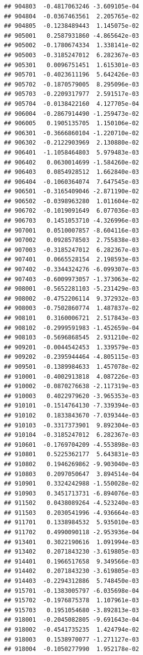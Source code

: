 \documentclass[ignorenonframetext,]{beamer}
\begin{document}
\begin{frame}[fragile]
\begin{verbatim}
## 904803  -0.4817063246 -3.609105e-04
## 904804  -0.0367463561  2.205765e-02
## 904805  -0.1238489443  1.145075e-02
## 905001   0.2587931860 -4.865642e-03
## 905002  -0.1780674334  1.338141e-02
## 905003  -0.3185247012  6.282367e-03
## 905301   0.0096751451  1.615301e-03
## 905701  -0.4023611196  5.642426e-03
## 905702  -0.1870579005  8.295096e-03
## 905703  -0.2209317977  2.591517e-03
## 905704  -0.0138422160  4.127705e-04
## 906004  -0.2867914490 -1.259473e-02
## 906005   0.1905135705  1.150106e-02
## 906301  -0.3666860104 -1.220710e-02
## 906302  -0.2122903969  2.130880e-02
## 906401  -1.1058464803  5.979483e-03
## 906402   0.0630014699 -1.584260e-02
## 906403   0.0854928512  1.662840e-03
## 906404  -0.1060364074  7.647545e-03
## 906501  -0.3165409046 -2.871190e-02
## 906502  -0.0398963280  1.011604e-02
## 906702  -0.1019091649  6.077036e-03
## 906703   0.1451053710 -4.326996e-03
## 907001   0.0510007857 -8.604116e-03
## 907002   0.0928578503  2.755838e-03
## 907003  -0.3185247012  6.282367e-03
## 907401   0.0665528154  2.198593e-03
## 907402  -0.3344324276 -6.099307e-03
## 907403  -0.6009973057 -1.373063e-02
## 908001  -0.5652281103 -5.231429e-03
## 908002  -0.4752206114  9.372932e-03
## 908003  -0.7502860774  1.487837e-02
## 908101   0.3160006721  2.517843e-03
## 908102  -0.2999591983 -1.452659e-04
## 908103  -0.5696868545  2.931210e-02
## 909201  -0.0044542453  1.339579e-03
## 909202  -0.2395944464 -4.805115e-03
## 909501  -0.1389984633  1.457078e-02
## 910001  -0.4002913818  4.087226e-03
## 910002  -0.0870276638 -2.117319e-03
## 910003   0.4022979620 -3.965353e-03
## 910101  -0.1514764130 -7.339394e-03
## 910102   0.1833843670 -7.039344e-03
## 910103  -0.3317373901  9.892304e-03
## 910104  -0.3185247012  6.282367e-03
## 910601  -0.1769704209 -4.553898e-03
## 910801   0.5225362177  5.643831e-03
## 910802   0.1946269862 -9.903040e-03
## 910803   0.2097050647  3.894514e-04
## 910901   0.3324242988 -1.550028e-02
## 910903   0.3451713731 -6.894076e-03
## 911502   0.0438089264 -4.523240e-03
## 911503   0.2030541996 -4.936664e-03
## 911701   0.1338984532  5.935010e-03
## 911702   0.4990090118 -2.953936e-04
## 913401   0.3022190616  1.091994e-03
## 913402   0.2071843230 -3.619805e-03
## 914401   0.1966517658  9.349566e-03
## 914402   0.2071843230 -3.619805e-03
## 914403  -0.2294312886  5.748450e-03
## 915701  -0.1383005797 -6.035698e-04
## 915702  -0.1976875378  1.107961e-03
## 915703   0.1951054680 -3.892813e-03
## 918001  -0.2045082805 -9.691643e-04
## 918002  -0.4541735235  1.424794e-02
## 918003   0.1538970077 -1.271127e-03
## 918004  -0.1050277990  1.952178e-02

\end{verbatim}
\end{frame}
\end{document}
